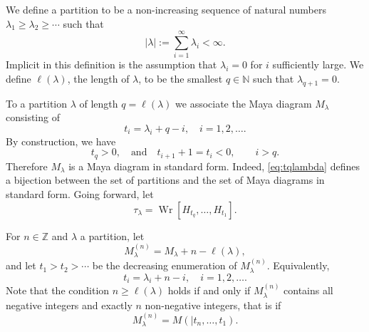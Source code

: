 \documentclass{amsart}
\theoremstyle{definition}
\newcommand{\Wr}{\operatorname{Wr}}
\newcommand{\N}{\mathbb{N}}
\newcommand{\Z}{\mathbb{Z}}
\begin{document}
We define a partition to be a non-increasing sequence of natural
numbers $\lambda_1 \geq \lambda_2 \geq \cdots $ such that
\[ |\lambda| := \sum_{i=1}^\infty \lambda_i< \infty.\] Implicit in
this definition is the assumption that $\lambda_i=0$ for $i$
sufficiently large.  We define $\ell(\lambda)$, the length of
$\lambda$, to be the smallest $q\in \N$ such that $\lambda_{q+1}=0$.

To a partition $\lambda$ of length $q=\ell(\lambda)$ we associate the
Maya diagram $M_\lambda$ consisting of
\begin{equation}
  \label{eq:tqlambda}
  t_i = \lambda_i + q - i,\quad i=1,2,\ldots.
\end{equation}
By construction, we have
\[t_q>0,\quad \text{and}\quad t_{i+1}+1 = t_i<0,\qquad i> q. \]
Therefore $M_\lambda$ is a Maya diagram in standard form.  Indeed,
\eqref{eq:tqlambda} defines a bijection between the set of partitions
and the set of Maya diagrams in standard form.  Going forward, let
\begin{equation}
  \label{eq:taulambda}
  \tau_\lambda = \Wr[H_{t_{q}},\ldots, H_{t_1} ].
\end{equation}

For $n\in \Z$ and $\lambda$ a partition, let
\[ M^{(n)}_\lambda = M_\lambda + n -\ell(\lambda),\]
and let $t_1>t_2>\cdots$ be the decreasing enumeration of
$M^{(n)}_\lambda$. Equivalently,
\begin{equation}
  \label{eq:tnlambda}
   t_i = \lambda_i + n-i,\quad i=1,2,\ldots. 
\end{equation}
Note that the condition
$n \geq \ell(\lambda)$ holds if  and only if $M_\lambda^{(n)}$
contains all negative integers and exactly $n$ non-negative integers, that is if
\[ M_\lambda^{(n)} = M(\mid t_n,\ldots, t_1).\]

\end{document}
